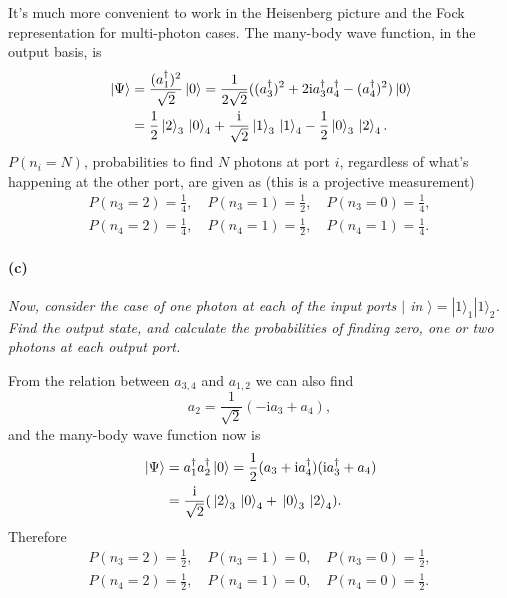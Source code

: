 \documentclass[hyperref, a4paper]{article}
\newcommand*{\ii}{\mathrm{i}}
\begin{document}
It's much more convenient to work in the Heisenberg picture and the Fock representation 
for multi-photon cases.
The many-body wave function, in the output basis, is 
\begin{equation}
    \begin{aligned}
        \ket*{\Psi} &= \frac{(a_1^\dag)^2}{\sqrt{2}} \ket*{0} 
        = \frac{1}{2 \sqrt{2}} ((a_3^\dag)^2 + 2 \ii a_3^\dag a_4^\dag - (a_4^\dag)^2 ) \ket*{0} \\
        &= \frac{1}{2} \ket*{2}_3 \ket*{0}_4 + \frac{\ii}{\sqrt{2}} \ket*{1}_3 \ket*{1}_4 - \frac{1}{2} \ket*{0}_3 \ket*{2}_4.
    \end{aligned}
\end{equation} 
$P(n_i = N)$, probabilities to find $N$ photons at port $i$, 
regardless of what's happening at the other port, are given as (this is a projective measurement)
\begin{equation}
    \begin{aligned}
        P(n_3=2) = \frac{1}{4}, \quad P(n_3=1) = \frac{1}{2}, \quad P(n_3=0) = \frac{1}{4}, \\ 
        P(n_4=2) = \frac{1}{4}, \quad P(n_4=1) = \frac{1}{2}, \quad P(n_4=1) = \frac{1}{4}.
    \end{aligned}
\end{equation}

\paragraph*{(c)} \textit{Now, consider the case of one photon at each of the input ports $\mid$ in $\rangle=|1\rangle_1|1\rangle_2$. Find the output state, and calculate the probabilities of finding zero, one or two photons at each output port.} 

From the relation between $a_{3,4}$ and $a_{1,2}$ we can also find 
\begin{equation}
    a_2 = \frac{1}{\sqrt{2}} (- \ii a_3 + a_4) ,
\end{equation}
and the many-body wave function now is 
\begin{equation}
    \begin{aligned}
        \ket*{\Psi} &= a_1^\dag a_2^\dag \ket*{0}
        = \frac{1}{2} (a_3 + \ii a_4^\dag) (\ii a_3^\dag + a_4) \\
        &= \frac{\ii}{\sqrt{2}} (\ket*{2}_3 \ket*{0}_4 + \ket*{0}_3 \ket*{2}_4).
    \end{aligned}
\end{equation}
Therefore
\begin{equation}
    \begin{aligned}
        P(n_3=2) = \frac{1}{2}, \quad P(n_3=1) = 0, \quad P(n_3=0) = \frac{1}{2}, \\
        P(n_4=2) = \frac{1}{2}, \quad P(n_4=1) = 0, \quad P(n_4=0) = \frac{1}{2}. \\
    \end{aligned}
\end{equation}
\end{document}
